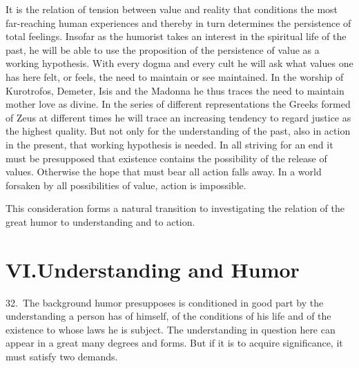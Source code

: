 \documentclass[12pt]{book}
\newcommand{\opage}[1]{\marginnote{\footnotesize\textit{[#1]}}}
\begin{document}
It is the relation of tension between value and reality that conditions the most far-reaching
human experiences and thereby in turn determines the persistence of total feelings. Insofar as
the humorist takes an interest in the spiritual life of the past, he will be able to use the
proposition of the persistence of value as a working hypothesis. With every dogma and every
cult he will ask what values one has here felt, or feels, the need to maintain or see
maintained. In the worship of Kurotrofos, Demeter, Isis and the Madonna he thus traces the
need to maintain mother love as divine. In the series of different representations the Greeks
formed of Zeus at \opage{111}different times he will trace an increasing tendency to regard
justice as the highest quality. But not only for the understanding of the past, also in
action in the present, that working hypothesis is needed. In all striving for an end it must
be presupposed that existence contains the possibility of the release of values. Otherwise the
hope that must bear all action falls away. In a world forsaken by all possibilities of value,
action is impossible.

This consideration forms a natural transition to investigating the relation of the great
humor to understanding and to action.

\chapter*{VI.\quad Understanding and Humor}
\opage{112}32.~The background humor presupposes is conditioned in good part by the
understanding a person has of himself, of the conditions of his life and of the existence
to whose laws he is subject. The understanding in question here can appear in a great many
degrees and forms. But if it is to acquire significance, it must satisfy two demands.
\end{document}

